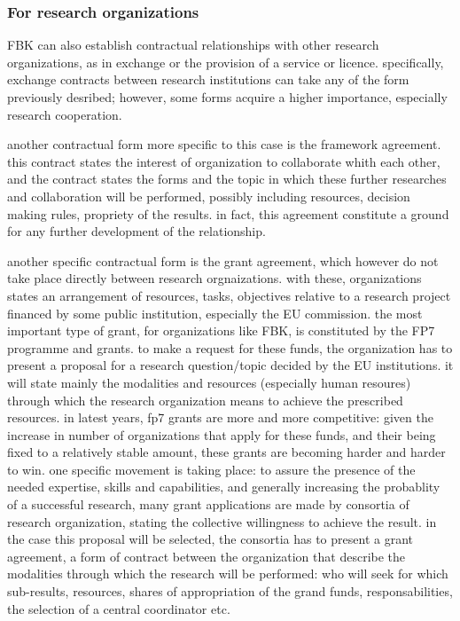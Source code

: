 \subsubsection{For research organizations}

FBK can also establish contractual relationships with other research organizations, as in exchange or the provision of a service or licence. specifically, exchange contracts between research institutions can take any of the form previously desribed; however, some forms acquire a higher importance, especially research cooperation.

another contractual form more specific to this case is the framework agreement. this contract states the interest of organization to collaborate whith each other, and the contract states the forms and the topic in which these further researches and collaboration will be performed, possibly including resources, decision making rules, propriety of the results. in fact, this agreement constitute a ground for any further development of the relationship.

another specific contractual form is the grant agreement, which however do not take place directly between research orgnaizations. with these, organizations states an arrangement of resources, tasks, objectives relative to a research project financed by some public institution, especially the EU commission. the most important type of grant, for organizations like FBK, is constituted by the FP7 programme and grants. to make a request for these funds, the organization has to present a proposal for a research question/topic decided by the EU institutions. it will state mainly the modalities and resources (especially human resoures) through which the research organization means to achieve the prescribed resources. in latest years, fp7 grants are more and more competitive: given the increase in number of organizations that apply for these funds, and their being fixed to a relatively stable amount, these grants are becoming harder and harder to win. one specific movement is taking place: to assure the presence of the needed expertise, skills and capabilities, and generally increasing the probablity of a successful research, many grant applications are made by consortia of research organization, stating the collective willingness to achieve the result. in the case this proposal will be selected, the consortia has to present a grant agreement, a form of contract between the organization that describe the modalities through which the research will be performed: who will seek for which sub-results, resources, shares of appropriation of the grand funds, responsabilities, the selection of a central coordinator etc. 


